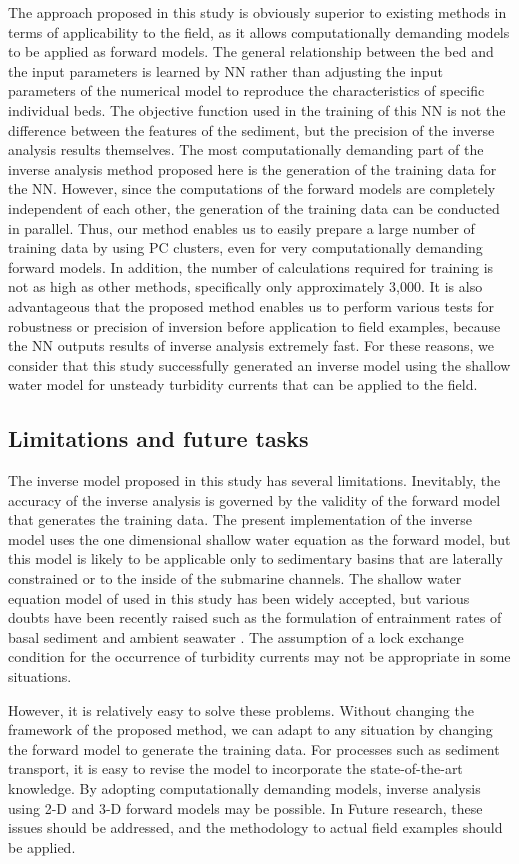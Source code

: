 The approach proposed in this study is obviously superior to existing methods in terms of applicability to the field, as it allows computationally demanding models to be applied as forward models. The general relationship between the bed and the input parameters is learned by NN rather than adjusting the input parameters of the numerical model to reproduce the characteristics of specific individual beds. The objective function used in the training of this NN is not the difference between the features of the sediment, but the precision of the inverse analysis results themselves. The most computationally demanding part of the inverse analysis method proposed here is the generation of the training data for the NN. However, since the computations of the forward models are completely independent of each other, the generation of the training data can be conducted in parallel. Thus, our method enables us to easily prepare a large number of training data by using PC clusters, even for very computationally demanding forward models. In addition, the number of calculations required for training is not as high as other methods, specifically only approximately 3,000. It is also advantageous that the proposed method enables us to perform various tests for robustness or precision of inversion before application to field examples, because the NN outputs results of inverse analysis extremely fast. For these reasons, we consider that this study successfully generated an inverse model using the shallow water model for unsteady turbidity currents that can be applied to the field. 

\subsection{Limitations and future tasks}

The inverse model proposed in this study has several limitations. Inevitably, the accuracy of the inverse analysis is governed by the validity of the forward model that generates the training data. The present implementation of the inverse model uses the one dimensional shallow water equation as the forward model, but this model is likely to be applicable only to sedimentary basins that are laterally constrained or to the inside of the submarine channels. The shallow water equation model of \citet{parker1986self} used in this study has been widely accepted, but various doubts have been recently raised such as the formulation of entrainment rates of basal sediment \citep{Dorrell2018} and ambient seawater \citep{Luchi2018}. The assumption of a lock exchange condition for the occurrence of turbidity currents may not be appropriate in some situations. 

However, it is relatively easy to solve these problems. Without changing the framework of the proposed method, we can adapt to any situation by changing the forward model to generate the training data. For processes such as sediment transport, it is easy to revise the model to incorporate the state-of-the-art knowledge. By adopting computationally demanding models, inverse analysis using 2-D and 3-D forward models may be possible. In Future research, these issues should be addressed, and the methodology to actual field examples should be applied.